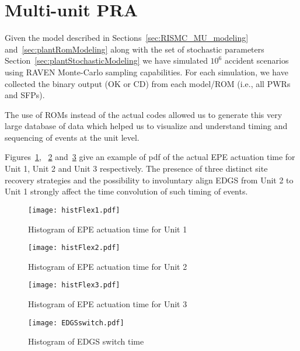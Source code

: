 \section{Multi-unit PRA}
\label{sec:multiUnitPRA}

Given the model described in Sections~\ref{sec:RISMC_MU_modeling} and~\ref{sec:plantRomModeling} 
along with the set of stochastic parameters Section~\ref{sec:plantStochasticModeling} we have 
simulated $10^6$ accident scenarios using RAVEN Monte-Carlo sampling
capabilities. For each simulation, we have collected the binary output (OK or CD) from 
each model/ROM (i.e., all PWRs and SFPs).

The use of ROMs instead of the actual codes allowed us to generate this very large 
database of data which helped us to visualize and understand timing and sequencing of events at 
the unit level.

Figures~\ref{fig:histFlex1}, ~\ref{fig:histFlex2} and~\ref{fig:histFlex3} give an example of pdf
of the actual EPE actuation time for Unit 1, Unit 2 and Unit 3 respectively. 
The presence of three distinct site recovery strategies and the possibility to involuntary align
EDGS from Unit 2 to Unit 1 strongly affect the time convolution of such timing of events. 

\begin{figure}
    \centering
    \texttt{[image: histFlex1.pdf]}
    \caption{Histogram of EPE actuation time for Unit 1}
    \label{fig:histFlex1}
\end{figure}

\begin{figure}
    \centering
    \texttt{[image: histFlex2.pdf]}
    \caption{Histogram of EPE actuation time for Unit 2}
    \label{fig:histFlex2}
\end{figure}

\begin{figure}
    \centering
    \texttt{[image: histFlex3.pdf]}
    \caption{Histogram of EPE actuation time for Unit 3}
    \label{fig:histFlex3}
\end{figure}

\begin{figure}
    \centering
    \texttt{[image: EDGSswitch.pdf]}
    \caption{Histogram of EDGS switch time}
    \label{fig:EDGSswitch}
\end{figure}